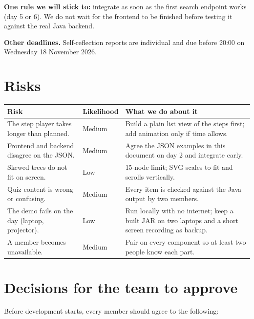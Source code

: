 \documentclass[11pt,a4paper]{article}
\begin{document}
\textbf{One rule we will stick to:} integrate as soon as the first search endpoint works (day 5 or 6).
We do not wait for the frontend to be finished before testing it against the real Java backend.

\textbf{Other deadlines.} Self-reflection reports are individual and due before 20:00 on
Wednesday 18 November 2026.

\section{Risks}

\begin{tabularx}{\textwidth}{@{}L l L@{}}
  \toprule
  \textbf{Risk} & \textbf{Likelihood} & \textbf{What we do about it} \\
  \midrule
  The step player takes longer than planned. & Medium & Build a plain list view of the steps first; add animation only if time allows. \\
  Frontend and backend disagree on the JSON. & Medium & Agree the JSON examples in this document on day 2 and integrate early. \\
  Skewed trees do not fit on screen. & Low & 15-node limit; SVG scales to fit and scrolls vertically. \\
  Quiz content is wrong or confusing. & Medium & Every item is checked against the Java output by two members. \\
  The demo fails on the day (laptop, projector). & Low & Run locally with no internet; keep a built JAR on two laptops and a short screen recording as backup. \\
  A member becomes unavailable. & Medium & Pair on every component so at least two people know each part. \\
  \bottomrule
\end{tabularx}

\section{Decisions for the team to approve}

Before development starts, every member should agree to the following:
\end{document}
